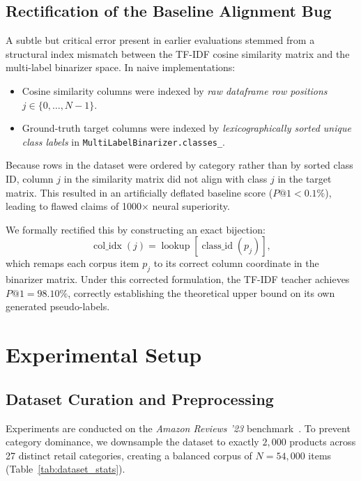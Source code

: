 \documentclass[11pt]{article}
\begin{document}
\subsection{Rectification of the Baseline Alignment Bug}
A subtle but critical error present in earlier evaluations stemmed from a structural index mismatch between the TF-IDF cosine similarity matrix and the multi-label binarizer space. In naive implementations:
\begin{itemize}
  \item Cosine similarity columns were indexed by \emph{raw dataframe row positions} $j \in \{0, \dots, N-1\}$.
  \item Ground-truth target columns were indexed by \emph{lexicographically sorted unique class labels} in \texttt{MultiLabelBinarizer.classes\_}.
\end{itemize}
Because rows in the dataset were ordered by category rather than by sorted class ID, column $j$ in the similarity matrix did not align with class $j$ in the target matrix. This resulted in an artificially deflated baseline score ($P@1 < 0.1\%$), leading to flawed claims of 1000$\times$ neural superiority.

We formally rectified this by constructing an exact bijection:
\begin{equation}
  \operatorname{col\_idx}(j) = \operatorname{lookup}\left[\operatorname{class\_id}(p_j)\right],
\end{equation}
which remaps each corpus item $p_j$ to its correct column coordinate in the binarizer matrix. Under this corrected formulation, the TF-IDF teacher achieves $P@1 = 98.10\%$, correctly establishing the theoretical upper bound on its own generated pseudo-labels.

\section{Experimental Setup}\label{sec:experiments}

\subsection{Dataset Curation and Preprocessing}
Experiments are conducted on the \textit{Amazon Reviews '23} benchmark~\cite{amazon}. To prevent category dominance, we downsample the dataset to exactly $2{,}000$ products across 27 distinct retail categories, creating a balanced corpus of $N = 54{,}000$ items (Table~\ref{tab:dataset_stats}).
\end{document}
